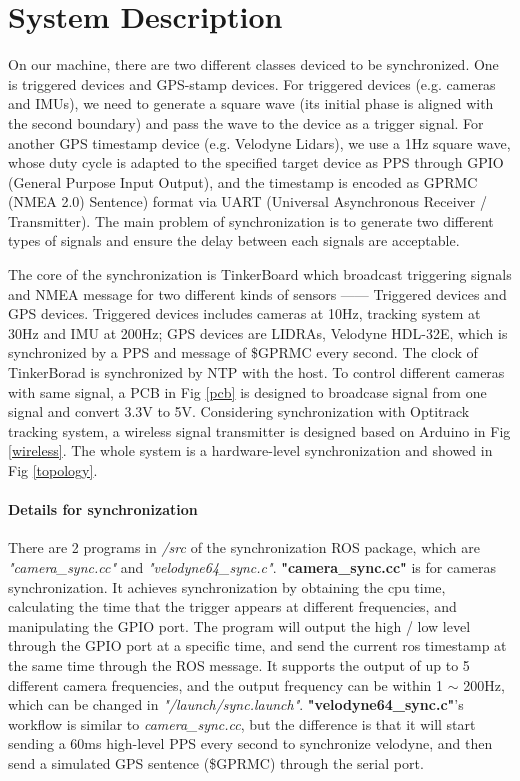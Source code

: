 \documentclass[conference]{IEEEtran}
\begin{document}
	\section{System Description}
	On our machine, there are two different classes deviced to be synchronized. One is triggered devices and GPS-stamp devices. For triggered devices (e.g. cameras and IMUs), we need to generate a square wave (its initial phase is aligned with the second boundary) and pass the wave to the device as a trigger signal. For another GPS timestamp device (e.g. Velodyne Lidars), we use a 1Hz square wave, whose duty cycle is adapted to the specified target device as PPS through GPIO (General Purpose Input Output), and the timestamp is encoded as GPRMC (NMEA 2.0) Sentence) format via UART (Universal Asynchronous Receiver / Transmitter). The main problem of synchronization is to generate two different types of signals and ensure the delay between each signals are acceptable.
	\par
	The core of the synchronization is TinkerBoard which broadcast triggering signals and NMEA message for two different kinds of sensors ------ Triggered devices and GPS devices. Triggered devices includes cameras at 10Hz, tracking system at 30Hz and IMU at 200Hz; GPS devices are LIDRAs, Velodyne HDL-32E, which is synchronized by a PPS and message of \$GPRMC every second. The clock of TinkerBorad is synchronized by NTP with the host. To control different cameras with same signal, a PCB in Fig \ref{pcb} is designed to broadcase signal from one signal and convert 3.3V to 5V. Considering synchronization with Optitrack tracking system, a wireless signal transmitter is designed based on Arduino in Fig \ref{wireless}. The whole system is a hardware-level synchronization and showed in Fig \ref{topology}.
	\paragraph{Details for synchronization}
	There are 2 programs in \textit{/src} of the synchronization ROS package, which are \textit{"camera\_sync.cc"} and \textit{"velodyne64\_sync.c"}. \textbf{"camera\_sync.cc"} is for cameras synchronization. It achieves synchronization by obtaining the cpu time, calculating the time that the trigger appears at different frequencies, and manipulating the GPIO port. The program will output the high / low level through the GPIO port at a specific time, and send the current ros timestamp at the same time through the ROS message. It supports the output of up to 5 different camera frequencies, and the output frequency can be within 1 $\sim$ 200Hz, which can be changed in \textit{"/launch/sync.launch"}. \textbf{"velodyne64\_sync.c"}'s workflow is similar to \textit{camera\_sync.cc}, but the difference is that it will start sending a 60ms high-level PPS every second to synchronize velodyne, and then send a simulated GPS sentence (\$GPRMC) through the serial port.
	
\end{document}
